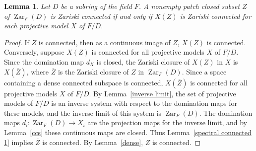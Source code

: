 \documentclass[preprint, 11pt,nonatbib]{elsarticle}
\DeclareMathOperator{\Dom}{Val}
\DeclareMathOperator{\Zar}{Zar}
\newtheorem{lemma}[theorem]{Lemma}
\theoremstyle{definition}
\newtheorem{example}[theorem]{Example}
\numberwithin{theorem}{section}
\begin{document}
 
\begin{lemma} \label{connected iff} Let $D$ be a subring of the field $F$.  A nonempty patch closed  subset ${Z}$ of $\Zar_F(D)$ is Zariski connected   if and only if $X({Z})$ is Zariski connected  for each projective model $X$ of $F/D$.  
\end{lemma} 

\begin{proof} 
If $Z$ is connected, then as a continuous image of $Z$, $X(Z)$ is  connected. Conversely, suppose $X(Z)$ is connected for all projective models $X$ of $F/D$.  Since the domination map $d_X$ is closed, the Zariski closure of $X(Z)$ in $X$ is $X(\overline{Z})$, where $\overline{Z}$ is the Zariski closure of $Z$ in $\Zar_F(D)$. Since a space containing a dense connected subspace is connected, $X(\overline{Z})$ is connected for all projective models $X$ of $F/D$.  
By Lemma~\ref{inverse limit}, the set of projective models of $F/D$ is an inverse system with respect to the domination maps for these models, and the inverse limit of this system is $\Zar_F(D)$. The domination maps $d_i:\Zar_F(D) \rightarrow X_i$ are the projection maps for the inverse limit, and by Lemma~\ref{ccs} these continuous maps are closed. Thus Lemma~\ref{spectral connected 1} implies $\overline{Z}$ is connected. By Lemma~\ref{dense}, $Z$ is connected. 
 \end{proof}

 


 
 
 

\end{document}
